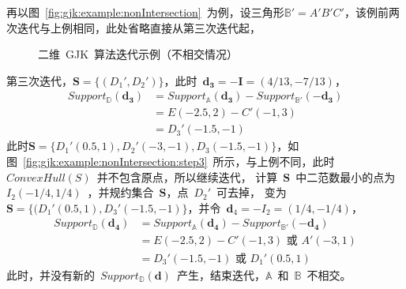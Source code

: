 再以图~\ref{fig:gjk:example:nonIntersection}~为例，设三角形$\mathbb{B'} = A'B'C'$，该例前两次迭代与上例相同，此处省略直接从第三次迭代起，
\begin{figure}[H]
\centering
{} 
\caption{二维~GJK~算法迭代示例（不相交情况）}
\label{fig:gjk:example:2d:intersection:iterator}
\end{figure}
第三次迭代，$\bm{S} = \{(D_1', D_2') \}$，此时~$\bm{d_3}=-\bm{I}=(4/13, -7/13)$，
\begin{equation}
  \begin{array}{ll}
  Support_\mathbb{D}(\bm{d_3})  & = Support_\mathbb{A}(\bm{d_3}) - Support_\mathbb{B'}(-\bm{d_3}) \\
    & = E(-2.5, 2) - C'(-1, 3) \\
    & = D_3'(-1.5, -1)
  \end{array}
  \label{euqa:gjk:non:step3}
\end{equation}
此时$\bm{S} = \{D_1'(0.5, 1), D_2'(-3, -1), D_3(-1.5, -1)\}$，如图~\ref{fig:gjk:example:nonIntersection:step3}~所示，与上例不同，此时~$ConvexHull(S)$~并不包含原点，所以继续迭代，
计算~$\bm{S}$~中二范数最小的点为~$I_2(-1/4, 1/4)$~，并规约集合~$\bm{S}$，点~$D_2'$~可去掉，
变为$\bm{S} = \{ (D_1'(0.5, 1), D_3'(-1.5, -1)\}$，并令~$\bm{d}_4 = -I_2 = (1/4, -1/4)$，
\begin{equation}
  \begin{array}{ll}
  Support_\mathbb{D}(\bm{d_4})  & = Support_\mathbb{A}(\bm{d_4}) - Support_\mathbb{B'}(-\bm{d_4}) \\
    & = E(-2.5, 2) - C'(-1, 3) \textbf{~或~} A'(-3, 1)  \\
    & = D_3'(-1.5, -1) \textbf{~或~} D_1'(0.5, 1)
  \end{array}
  \label{euqa:gjk:non:step4}
\end{equation}
此时，并没有新的~$Support_\mathbb{D}(\bm{d})$~产生，结束迭代，$\mathbb{A}$~和~$\mathbb{B}$~不相交。

